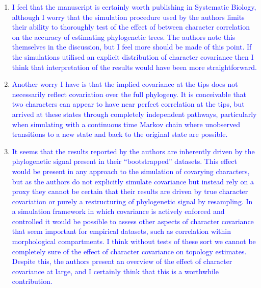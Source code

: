 \documentclass[12pt,letterpaper]{article}
\begin{document}
\begin{enumerate}

\item{\textcolor{blue}{I feel that the manuscript is certainly worth publishing in Systematic Biology, although I worry that the simulation procedure used by the authors limits their ability to thoroughly test of the effect of between character correlation on the accuracy of estimating phylogenetic trees. The authors note this themselves in the discussion, but I feel more should be made of this point. If the simulations utilised an explicit distribution of character covariance then I think that interpretation of the results would have been more straightforward.}}


\item{\textcolor{blue}{Another worry I have is that the implied covariance at the tips does not necessarily reflect covariation over the full phylogeny. It is conceivable that two characters can appear to have near perfect correlation at the tips, but arrived at these states through completely independent pathways, particularly when simulating with a continuous time Markov chain where unobserved transitions to a new state and back to the original state are possible.}}


\item{\textcolor{blue}{It seems that the results reported by the authors are inherently driven by the phylogenetic signal present in their ``bootstrapped'' datasets. This effect would be present in any approach to the simulation of covarying characters, but as the authors do not explicitly simulate covariance but instead rely on a proxy they cannot be certain that their results are driven by true character covariation or purely a restructuring of phylogenetic signal by resampling. In a simulation framework in which covariance is actively enforced and controlled it would be possible to assess other aspects of character covariance that seem important for empirical datasets, such as correlation within morphological compartments. I think without tests of these sort we cannot be completely sure of the effect of character covariance on topology estimates. Despite this, the authors present an overview of the effect of character covariance at large, and I certainly think that this is a worthwhile contribution.}}


\end{enumerate}
\end{document}
